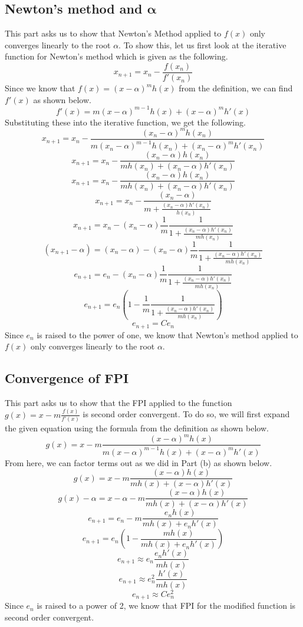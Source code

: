 \documentclass{article}
\begin{document}
\subsection{Newton's method and \(\mathbf{\alpha}\)}
This part asks us to show that Newton's Method applied to \(f(x)\) only converges linearly to the root \(\alpha\). To show this, let us first look at the iterative function for Newton's method which is given as the following.
\[
x_{n+1}=x_n-\frac{f(x_n)}{f'(x_n)}
\]
Since we know that \(f(x) = (x-\alpha)^mh(x)\) from the definition, we can find \(f'(x)\) as shown below.
\[
f'(x) = m(x-\alpha)^{m-1}h(x)+(x-\alpha)^mh'(x)
\]
Substituting these into the iterative function, we get the following.
\[
x_{n+1}=x_n-\frac{(x_n-\alpha)^mh(x_n)}{m(x_n-\alpha)^{m-1}h(x_n)+(x_n-\alpha)^mh'(x_n)}
\]
\[
x_{n+1}=x_n-\frac{(x_n-\alpha)h(x_n)}{mh(x_n)+(x_n-\alpha)h'(x_n)}
\]
\[
x_{n+1}=x_n-\frac{(x_n-\alpha)h(x_n)}{mh(x_n)+(x_n-\alpha)h'(x_n)}
\]
\[
x_{n+1}=x_n-\frac{(x_n-\alpha)}{m+\frac{(x_n-\alpha)h'(x_n)}{h(x_n)}}
\]
\[
x_{n+1}=x_n-(x_n-\alpha)\frac{1}{m}\frac{1}{1+\frac{(x_n-\alpha)h'(x_n)}{mh(x_n)}}
\]
\[
(x_{n+1}-\alpha) = (x_n-\alpha)-(x_n-\alpha)\frac{1}{m}\frac{1}{1+\frac{(x_n-\alpha)h'(x_n)}{mh(x_n)}}
\]
\[
e_{n+1} = e_n-(x_n-\alpha)\frac{1}{m}\frac{1}{1+\frac{(x_n-\alpha)h'(x_n)}{mh(x_n)}}
\]
\[
e_{n+1} = e_n(1-\frac{1}{m}\frac{1}{1+\frac{(x_n-\alpha)h'(x_n)}{mh(x_n)}})
\]
\[
e_{n+1} = Ce_n
\]
Since \(e_n\) is raised to the power of one, we know that Newton's method applied to \(f(x)\) only converges linearly to the root \(\alpha\).

\subsection{Convergence of FPI}
This part asks us to show that the FPI applied to the function \(g(x) = x - m\frac{f(x)}{f'(x)}\) is second order convergent. To do so, we will first expand the given equation using the formula from the definition as shown below.
\[
g(x) = x - m\frac{(x-\alpha)^mh(x)}{m(x-\alpha)^{m-1}h(x)+(x-\alpha)^mh'(x)}
\]
From here, we can factor terms out as we did in Part (b) as shown below.
\[
g(x) = x - m\frac{(x-\alpha)h(x)}{mh(x)+(x-\alpha)h'(x)}
\]
\[
g(x)-\alpha = x - \alpha - m\frac{(x-\alpha)h(x)}{mh(x)+(x-\alpha)h'(x)}
\]
\[
e_{n+1} = e_n - m\frac{e_nh(x)}{mh(x)+e_nh'(x)}
\]
\[
e_{n+1} = e_n(1 - \frac{mh(x)}{mh(x)+e_nh'(x)})
\]
\[
e_{n+1} \approx e_n\frac{e_nh'(x)}{mh(x)}
\]
\[
e_{n+1} \approx e_n^2\frac{h'(x)}{mh(x)}
\]
\[
e_{n+1} \approx Ce_n^2
\]
Since \(e_n\) is raised to a power of 2, we know that FPI for the modified function is second order convergent.
\end{document}
